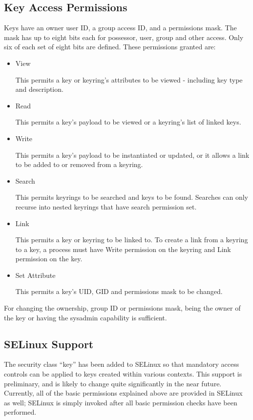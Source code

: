 \documentclass[a4paper,8pt,english]{sphinxmanual}
\begin{document}
\subsection{Key Access Permissions}
\label{security/keys/core:key-access-permissions}
Keys have an owner user ID, a group access ID, and a permissions mask. The mask
has up to eight bits each for possessor, user, group and other access. Only
six of each set of eight bits are defined. These permissions granted are:
\begin{itemize}
\item {} 
View

This permits a key or keyring's attributes to be viewed - including key
type and description.

\item {} 
Read

This permits a key's payload to be viewed or a keyring's list of linked
keys.

\item {} 
Write

This permits a key's payload to be instantiated or updated, or it allows a
link to be added to or removed from a keyring.

\item {} 
Search

This permits keyrings to be searched and keys to be found. Searches can
only recurse into nested keyrings that have search permission set.

\item {} 
Link

This permits a key or keyring to be linked to. To create a link from a
keyring to a key, a process must have Write permission on the keyring and
Link permission on the key.

\item {} 
Set Attribute

This permits a key's UID, GID and permissions mask to be changed.

\end{itemize}

For changing the ownership, group ID or permissions mask, being the owner of
the key or having the sysadmin capability is sufficient.


\subsection{SELinux Support}
\label{security/keys/core:selinux-support}
The security class ``key'' has been added to SELinux so that mandatory access
controls can be applied to keys created within various contexts.  This support
is preliminary, and is likely to change quite significantly in the near future.
Currently, all of the basic permissions explained above are provided in SELinux
as well; SELinux is simply invoked after all basic permission checks have been
performed.
\end{document}
